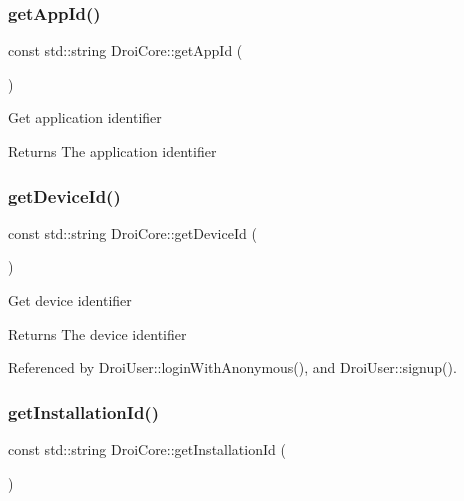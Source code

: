 \subsubsection{\texorpdfstring{get\+App\+Id()}{getAppId()}}
{\footnotesize\ttfamily const std\+::string Droi\+Core\+::get\+App\+Id (\begin{DoxyParamCaption}{ }\end{DoxyParamCaption})\hspace{0.3cm}{\ttfamily [static]}}

Get application identifier \begin{DoxyReturn}{Returns}
The application identifier 
\end{DoxyReturn}
\mbox{\label{class_droi_core_a81799368ed96e352f0f0e30dcc7606ae}} 
\subsubsection{\texorpdfstring{get\+Device\+Id()}{getDeviceId()}}
{\footnotesize\ttfamily const std\+::string Droi\+Core\+::get\+Device\+Id (\begin{DoxyParamCaption}{ }\end{DoxyParamCaption})\hspace{0.3cm}{\ttfamily [static]}}

Get device identifier \begin{DoxyReturn}{Returns}
The device identifier 
\end{DoxyReturn}


Referenced by Droi\+User\+::login\+With\+Anonymous(), and Droi\+User\+::signup().

\mbox{\label{class_droi_core_a9e6d6c3a1be97c6363dbce823d901169}} 
\subsubsection{\texorpdfstring{get\+Installation\+Id()}{getInstallationId()}}
{\footnotesize\ttfamily const std\+::string Droi\+Core\+::get\+Installation\+Id (\begin{DoxyParamCaption}{ }\end{DoxyParamCaption})\hspace{0.3cm}{\ttfamily [static]}}

